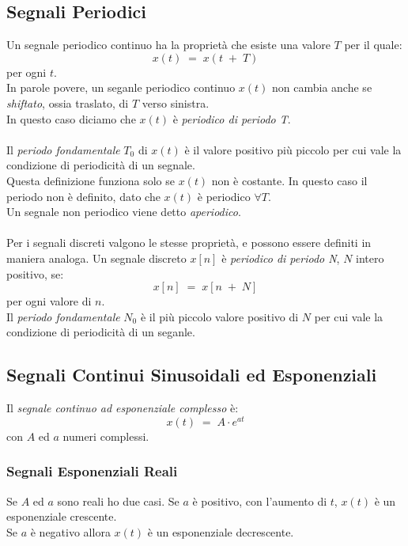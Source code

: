 \documentclass{article}
\begin{document}
		\subsection{Segnali Periodici}
			Un segnale periodico continuo ha la proprietà che esiste una valore $ T $ per il quale:
			\[
				x(t)\; =\; x(t\; +\; T)
			\]
			per ogni $ t $. \\
			In parole povere, un seganle periodico continuo $ x(t) $ non cambia anche se \textit{shiftato}, ossia traslato, di $ T $ verso sinistra. \\
			In questo caso diciamo che $ x(t) $ è \textit{periodico di periodo T}. \\
			\\
			Il \textit{periodo fondamentale} $ T_0 $ di $ x(t) $ è il valore positivo più piccolo per cui vale la condizione di periodicità di un segnale. \\
			Questa definizione funziona solo se $ x(t) $ non è costante. In questo caso il periodo non è definito, dato che $ x(t) $ è periodico $ \forall T $. \\
			Un segnale non periodico viene detto \textit{aperiodico}. \\
			\\
			Per i segnali discreti valgono le stesse proprietà, e possono essere definiti in maniera analoga. Un segnale discreto $ x[n] $ è \textit{periodico di periodo N}, $ N $ intero positivo, se:
			\[
				x[n]\; =\; x[n\; +\; N]
			\]
			per ogni valore di $ n $. \\
			Il \textit{periodo fondamentale} $ N_0 $ è il più piccolo valore positivo di $ N $ per cui vale la condizione di periodicità di un seganle.

		\subsection{Segnali Continui Sinusoidali ed Esponenziali}
			Il \textit{segnale continuo ad esponenziale complesso} è:
			\[
				x(t)\; =\; A\cdot e^{at}
			\]
			con $ A $ ed $ a $ numeri complessi.

			\subsubsection{Segnali Esponenziali Reali}
				Se $ A $ ed $ a $ sono reali ho due casi. Se $ a $ è positivo, con l'aumento di $ t $, $ x(t) $ è un esponenziale crescente. \\
				Se $ a $ è negativo allora $ x(t) $ è un esponenziale decrescente.
\end{document}
